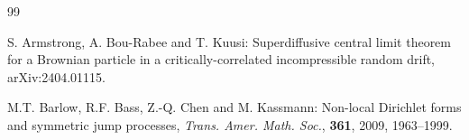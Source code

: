 \documentclass[11pt,draft, reqno]{amsart}
\theoremstyle{definition}
\numberwithin{equation}{section}
\begin{document}


\begin{thebibliography}{99}






 S. Armstrong, A. Bou-Rabee and T. Kuusi:
Superdiffusive central limit theorem for a Brownian particle in a critically-correlated incompressible random drift, arXiv:2404.01115.


 M.T. Barlow,  R.F. Bass, Z.-Q. Chen and  M. Kassmann: Non-local Dirichlet forms and symmetric jump processes,
\emph{Trans. Amer. Math. Soc.}, {\bf 361}, 2009, 1963--1999.






\end{thebibliography}
\end{document}
